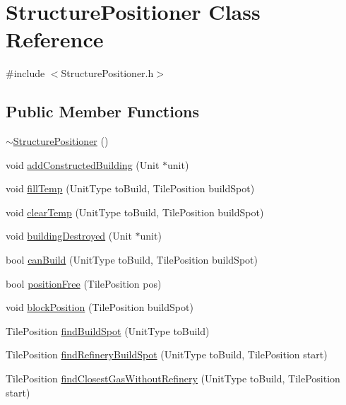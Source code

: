 \hypertarget{class_structure_positioner}{\section{Structure\-Positioner Class Reference}
\label{class_structure_positioner}
}


{\ttfamily \#include $<$Structure\-Positioner.\-h$>$}

\subsection*{Public Member Functions}
\begin{DoxyCompactItemize}
\item 
\hyperlink{class_structure_positioner_a185adcb9c16813aea873479aff2742fe}{$\sim$\-Structure\-Positioner} ()
\item 
void \hyperlink{class_structure_positioner_adb3c0b25a7f5aab221f0c4dad4e4b366}{add\-Constructed\-Building} (Unit $\ast$unit)
\item 
void \hyperlink{class_structure_positioner_a26f5177844c57cbe0b3b39cd2dfad3fb}{fill\-Temp} (Unit\-Type to\-Build, Tile\-Position build\-Spot)
\item 
void \hyperlink{class_structure_positioner_a507198ab61e3b89d46a2606764cd290d}{clear\-Temp} (Unit\-Type to\-Build, Tile\-Position build\-Spot)
\item 
void \hyperlink{class_structure_positioner_a2bb50dd6519f68778e5c988a86333b9a}{building\-Destroyed} (Unit $\ast$unit)
\item 
bool \hyperlink{class_structure_positioner_a524b5483a0cd30d39de6dc0a84a310ac}{can\-Build} (Unit\-Type to\-Build, Tile\-Position build\-Spot)
\item 
bool \hyperlink{class_structure_positioner_aee8a7e9ec413287ad0b47dacb8f467ff}{position\-Free} (Tile\-Position pos)
\item 
void \hyperlink{class_structure_positioner_a16b9b68a98dcabb1d059fba1a3aac182}{block\-Position} (Tile\-Position build\-Spot)
\item 
Tile\-Position \hyperlink{class_structure_positioner_add091d597cb6963b9141c7bb259e4aba}{find\-Build\-Spot} (Unit\-Type to\-Build)
\item 
Tile\-Position \hyperlink{class_structure_positioner_a29cd82d658d54df10bc15d7304023680}{find\-Refinery\-Build\-Spot} (Unit\-Type to\-Build, Tile\-Position start)
\item 
Tile\-Position \hyperlink{class_structure_positioner_a04642322946745406ee1927a2d19af22}{find\-Closest\-Gas\-Without\-Refinery} (Unit\-Type to\-Build, Tile\-Position start)

\end{DoxyCompactItemize}
